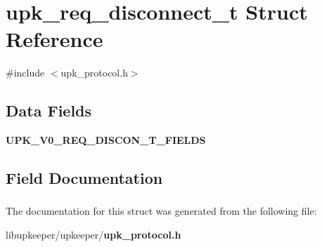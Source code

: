 \section{upk\_\-req\_\-disconnect\_\-t Struct Reference}
\label{structupk__req__disconnect__t}


{\ttfamily \#include $<$upk\_\-protocol.h$>$}

\subsection*{Data Fields}
\begin{DoxyCompactItemize}
\item 
{\bf UPK\_\-V0\_\-REQ\_\-DISCON\_\-T\_\-FIELDS}
\end{DoxyCompactItemize}


\subsection{Field Documentation}
\subsubsection[{UPK\_\-V0\_\-REQ\_\-DISCON\_\-T\_\-FIELDS}]{}\label{structupk__req__disconnect__t_a56fedd39c75b4b84c287717fc9955085}


The documentation for this struct was generated from the following file:\begin{DoxyCompactItemize}
\item 
libupkeeper/upkeeper/{\bf upk\_\-protocol.h}\end{DoxyCompactItemize}
